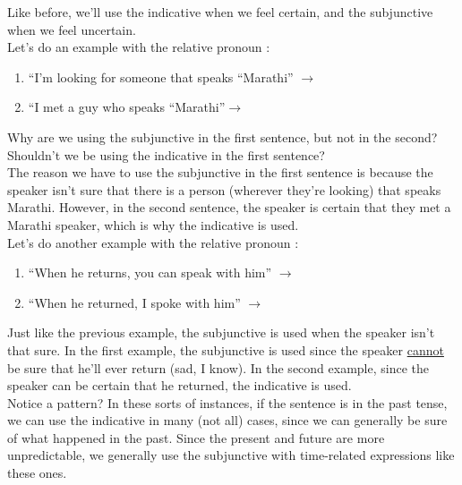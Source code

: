 Like before, we'll use the indicative when we feel certain, and the subjunctive when we feel uncertain. \\

Let's do an example with the relative pronoun :
\begin{enumerate}[noitemsep]
	\item ``I'm looking for someone that speaks ``Marathi'' $\rightarrow$ 
	\item ``I met a guy who speaks ``Marathi''$ \rightarrow$ 
\end{enumerate}

Why are we using the subjunctive in the first sentence, but not in the second? Shouldn't we be using the indicative in the first sentence? \\

The reason we have to use the subjunctive in the first sentence is because the speaker isn't sure that there is a person (wherever they're looking) that speaks Marathi. However, in the second sentence, the speaker is certain that they met a Marathi speaker, which is why the indicative is used. \\

Let's do another example with the relative pronoun :
\begin{enumerate}[noitemsep]
	\item ``When he returns, you can speak with him'' $\rightarrow$ 
	\item ``When he returned, I spoke with him'' $\rightarrow$ 
\end{enumerate}

Just like the previous example, the subjunctive is used when the speaker isn't that sure. In the first example, the subjunctive is used since the speaker \underline{cannot} be sure that he'll ever return (sad, I know). In the second example, since the speaker can be certain that he returned, the indicative is used. \\

Notice a pattern? In these sorts of instances, if the sentence is in the past tense, we can use the indicative in many (not all) cases, since we can generally be sure of what happened in the past. Since the present and future are more unpredictable, we generally use the subjunctive with time-related expressions like these ones. 

